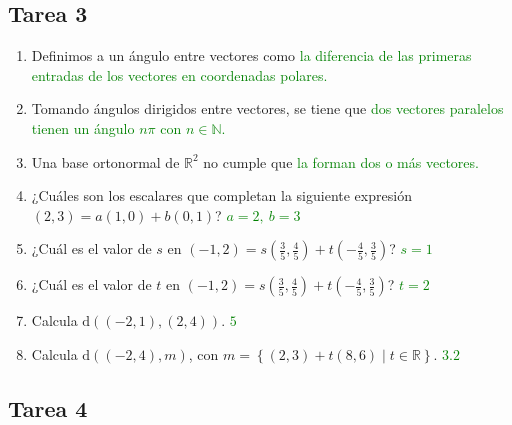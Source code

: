 \documentclass{article}
\theoremstyle{definicion}
\theoremstyle{definition}             %
\theoremstyle{definition}             %
\theoremstyle{definition}
\theoremstyle{definition}
\theoremstyle{observacion}
\theoremstyle{definition}
\theoremstyle{plain}
\theoremstyle{definition}
\theoremstyle{afirmacion}
\theoremstyle{notation}
\theoremstyle{definition}
\begin{document}
        \subsection{Tarea 3}

        \begin{enumerate}[label = Preg. \arabic*.]
            \item Definimos a un ángulo entre vectores como \textcolor{green}{la diferencia de las primeras entradas de los vectores en coordenadas polares.}
            \item Tomando ángulos dirigidos entre vectores, se tiene que \textcolor{green}{dos vectores paralelos tienen un ángulo \(n\pi\) con \(n \in \mathbb{N}\).}
            \item Una base ortonormal de \(\mathbb{R}^{2}\) no cumple que \textcolor{green}{la forman dos o más vectores.}
            \item ¿Cuáles son los escalares que completan la siguiente expresión \((2, 3) = a(1, 0) + b(0, 1)\)? \textcolor{green}{\(a = 2,\ b = 3\)}
            \item ¿Cuál es el valor de \(s\) en \((-1, 2) = s(\frac{3}{5}, \frac{4}{5}) + t(-\frac{4}{5}, \frac{3}{5})\)? \textcolor{green}{\(s = 1\)}
            \item ¿Cuál es el valor de \(t\) en \((-1, 2) = s(\frac{3}{5}, \frac{4}{5}) + t(-\frac{4}{5}, \frac{3}{5})\)? \textcolor{green}{\(t = 2\)}
            \item Calcula \(\textrm{d}((-2, 1), (2, 4))\). \textcolor{green}{\(5\)}
            \item Calcula \(\textrm{d}((-2, 4), m)\), con \(m = \left\lbrace(2, 3) + t(8, 6) \mid t \in \mathbb{R}\right\rbrace\). \textcolor{green}{\(3.2\)}
        \end{enumerate}

        \subsection{Tarea 4}
\end{document}
